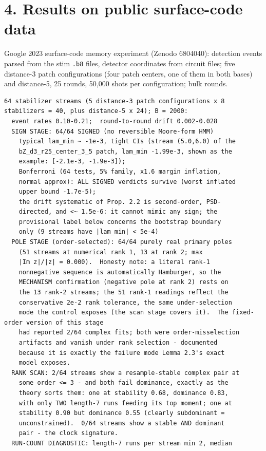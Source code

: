 \documentclass[11pt]{article}
\begin{document}
\section*{4. Results on public surface-code data}
Google 2023 surface-code memory experiment (Zenodo 6804040): detection events parsed from the stim \texttt{.b8} files, detector coordinates from circuit files; five distance-3 patch configurations (four patch centers, one of them in both bases) and distance-5, 25 rounds, 50{,}000 shots per configuration; bulk rounds.

\begin{small}\begin{verbatim}
64 stabilizer streams (5 distance-3 patch configurations x 8
stabilizers = 40, plus distance-5 x 24); B = 2000:
  event rates 0.10-0.21;  round-to-round drift 0.002-0.028
  SIGN STAGE: 64/64 SIGNED (no reversible Moore-form HMM)
    typical lam_min ~ -1e-3, tight CIs (stream (5.0,6.0) of the
    bZ_d3_r25_center_3_5 patch, lam_min -1.99e-3, shown as the
    example: [-2.1e-3, -1.9e-3]);
    Bonferroni (64 tests, 5% family, x1.6 margin inflation,
    normal approx): ALL SIGNED verdicts survive (worst inflated
    upper bound -1.7e-5);
    the drift systematic of Prop. 2.2 is second-order, PSD-
    directed, and <~ 1.5e-6: it cannot mimic any sign; the
    provisional label below concerns the bootstrap boundary
    only (9 streams have |lam_min| < 5e-4)
  POLE STAGE (order-selected): 64/64 purely real primary poles
    (51 streams at numerical rank 1, 13 at rank 2; max
    |Im z|/|z| = 0.000).  Honesty note: a literal rank-1
    nonnegative sequence is automatically Hamburger, so the
    MECHANISM confirmation (negative pole at rank 2) rests on
    the 13 rank-2 streams; the 51 rank-1 readings reflect the
    conservative 2e-2 rank tolerance, the same under-selection
    mode the control exposes (the scan stage covers it).  The fixed-order version of this stage
    had reported 2/64 complex fits; both were order-misselection
    artifacts and vanish under rank selection - documented
    because it is exactly the failure mode Lemma 2.3's exact
    model exposes.
  RANK SCAN: 2/64 streams show a resample-stable complex pair at
    some order <= 3 - and both fail dominance, exactly as the
    theory sorts them: one at stability 0.68, dominance 0.83,
    with only TWO length-7 runs feeding its top moment; one at
    stability 0.90 but dominance 0.55 (clearly subdominant =
    unconstrained).  0/64 streams show a stable AND dominant
    pair - the clock signature.
  RUN-COUNT DIAGNOSTIC: length-7 runs per stream min 2, median

\end{verbatim}
\end{small}
\end{document}
